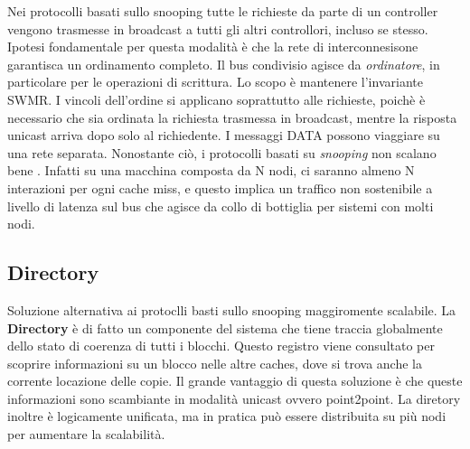 \noindent Nei protocolli basati sullo snooping tutte le richieste da parte di un controller vengono trasmesse in broadcast a tutti gli altri controllori, incluso se stesso. Ipotesi fondamentale per questa modalità è che la rete di interconnesisone garantisca un ordinamento completo. Il bus condivisio agisce da \textit{ordinatore}, in particolare per le operazioni di scrittura. Lo scopo è mantenere l'invariante SWMR. I vincoli dell'ordine si applicano soprattutto alle richieste, poichè è necessario che sia ordinata la richiesta trasmessa in broadcast, mentre la risposta unicast arriva dopo solo al richiedente. I messaggi DATA possono viaggiare su una rete separata. Nonostante ciò, i protocolli basati su \textit{snooping} non scalano bene . Infatti su una macchina composta da N nodi, ci saranno almeno N interazioni per ogni cache miss, e questo implica un traffico non sostenibile a livello di latenza sul bus che agisce da collo di bottiglia per sistemi con molti nodi. 

\subsection{Directory}
Soluzione alternativa ai protoclli basti sullo snooping maggiromente scalabile. La \textbf{Directory} è di fatto un componente del sistema che tiene traccia globalmente dello stato di coerenza di tutti i blocchi. Questo registro viene consultato per scoprire informazioni su un blocco nelle altre caches, dove si trova anche la corrente locazione delle copie. Il grande vantaggio di questa soluzione è che queste informazioni sono scambiante in modalità unicast ovvero point2point. La diretory inoltre è logicamente unificata, ma in pratica può essere distribuita su più nodi per aumentare la scalabilità.  


\begin{figure}[ht]
    \centering
    \setlength{\fboxrule}{0.5pt} %
    \setlength{\fboxsep}{0pt}    %
\end{figure}


